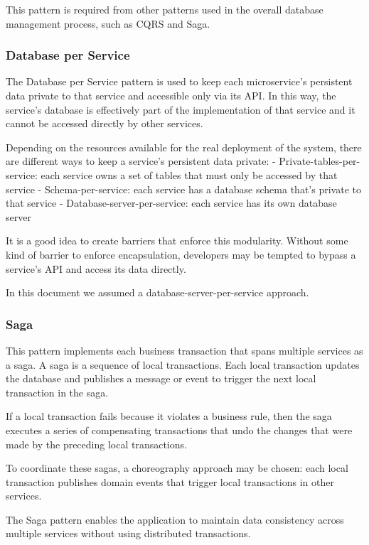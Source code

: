 This pattern is required from other patterns used in the overall database management process, such as CQRS and Saga.

\subsubsection{Database per Service}
The Database per Service pattern is used to keep each microservice’s persistent data private to that service and accessible only via its API. In this way, the service’s database is effectively part of the implementation of that service and it cannot be accessed directly by other services.

Depending on the resources available for the real deployment of the system, there are different ways to keep a service’s persistent data private:
\newline
- Private-tables-per-service: each service owns a set of tables that must only be accessed by that service
\newline
- Schema-per-service: each service has a database schema that’s private to that service
\newline
- Database-server-per-service: each service has its own database server

It is a good idea to create barriers that enforce this modularity. Without some kind of barrier to enforce encapsulation, developers may be tempted to bypass a service’s API and access its data directly.

In this document we assumed a database-server-per-service approach.

\subsubsection{Saga}
This pattern implements each business transaction that spans multiple services as a saga. A saga is a sequence of local transactions. Each local transaction updates the database and publishes a message or event to trigger the next local transaction in the saga. 

If a local transaction fails because it violates a business rule, then the saga executes a series of compensating transactions that undo the changes that were made by the preceding local transactions.

To coordinate these sagas, a choreography approach may be chosen: each local transaction publishes domain events that trigger local transactions in other services.

The Saga pattern enables the application to maintain data consistency across multiple services without using distributed transactions.

